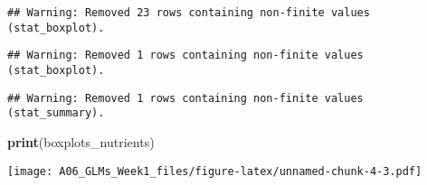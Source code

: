 \documentclass[]{article}
\newenvironment{Shaded}{\begin{snugshade}}{\end{snugshade}}
\newcommand{\CommentTok}[1]{\textcolor[rgb]{0.56,0.35,0.01}{\textit{#1}}}
\newcommand{\DataTypeTok}[1]{\textcolor[rgb]{0.13,0.29,0.53}{#1}}
\newcommand{\DecValTok}[1]{\textcolor[rgb]{0.00,0.00,0.81}{#1}}
\newcommand{\KeywordTok}[1]{\textcolor[rgb]{0.13,0.29,0.53}{\textbf{#1}}}
\newcommand{\NormalTok}[1]{#1}
\newcommand{\OperatorTok}[1]{\textcolor[rgb]{0.81,0.36,0.00}{\textbf{#1}}}
\newcommand{\StringTok}[1]{\textcolor[rgb]{0.31,0.60,0.02}{#1}}
\begin{document}
\begin{Shaded}
\end{Shaded}

\begin{verbatim}
## Warning: Removed 23 rows containing non-finite values (stat_boxplot).
\end{verbatim}

\begin{verbatim}
## Warning: Removed 1 rows containing non-finite values (stat_boxplot).
\end{verbatim}

\begin{verbatim}
## Warning: Removed 1 rows containing non-finite values (stat_summary).
\end{verbatim}

\begin{Shaded}
\begin{Highlighting}[]
\KeywordTok{print}\NormalTok{(boxplots_nutrients)}
\end{Highlighting}
\end{Shaded}

\texttt{[image: A06\_GLMs\_Week1\_files/figure-latex/unnamed-chunk-4-3.pdf]}
\end{document}
